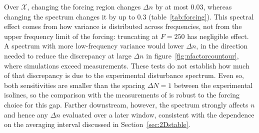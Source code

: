 \documentclass[lineno]{jfm}
\begin{document}
Over $\mathcal{X}$, changing the forcing region changes $\Delta n$ by at most $0.03$, whereas changing the spectrum changes it by up to $0.3$ (table~\ref{tab:forcing}). This spectral effect comes from how variance is distributed across frequencies, not from the upper frequency limit of the forcing: truncating at $F=250$ has negligible effect. A spectrum with more low-frequency variance would lower $\Delta n$, in the direction needed to reduce the discrepancy at large $\Delta n$ in figure~\ref{fig:nfactorcountour}, where simulations exceed measurements. These tests do not establish how much of that discrepancy is due to the experimental disturbance spectrum. Even so, both sensitivities are smaller than the spacing $\Delta N=1$ between the experimental isolines, so the comparison with the measurements of \citet{jeffGaps} is robust to the forcing choice for this gap. Farther downstream, however, the spectrum strongly affects $n$ and hence any $\Delta n$ evaluated over a later window, consistent with the dependence on the averaging interval discussed in Section~\ref{sec:2Dstable}.



\end{document}

